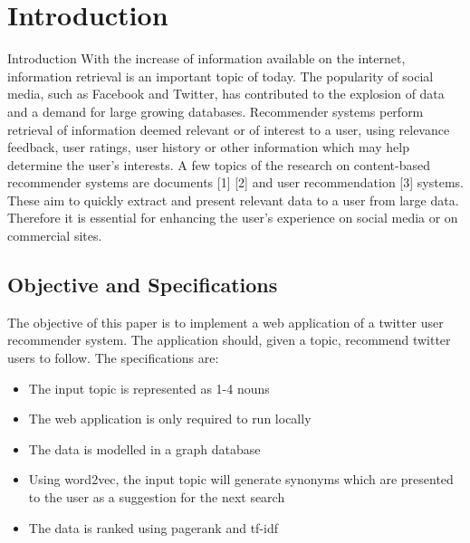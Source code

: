 \section{Introduction}
\label{sec:intro}

Introduction
With the increase of information available on the internet, information retrieval is an important topic of today. The popularity of social media, such as Facebook and Twitter, has contributed to the explosion of data and a demand for large growing databases. Recommender systems perform retrieval of information deemed relevant or of interest to a user, using relevance feedback, user ratings, user history or other information which may help determine the user’s interests. A few topics of the research on content-based recommender systems are documents [1] [2] and user recommendation [3] systems. These aim to quickly extract and present relevant data to a user from large data. Therefore it is essential for enhancing the user’s experience on social media or on commercial sites.  

\subsection{Objective and Specifications}
The objective of this paper is to implement a web application of a twitter user recommender system. The application should, given a topic, recommend twitter users to follow. The specifications are:
\begin{itemize}
\item The input topic is represented as 1-4 nouns
\item The web application is only required to run locally
\item The data is modelled in a graph database
\item Using word2vec, the input topic will generate synonyms which are presented to the user as a suggestion for the next search
\item The data is ranked using pagerank and tf-idf
\end{itemize}

